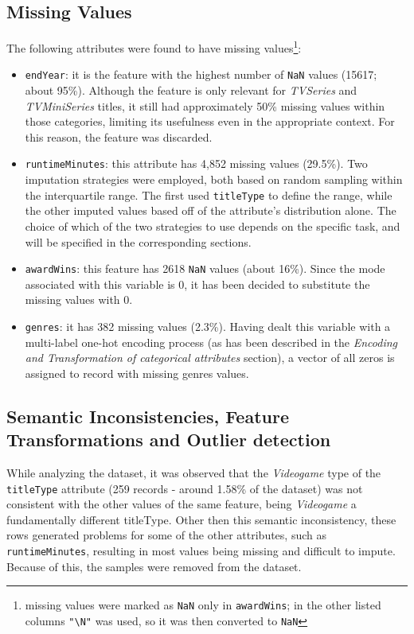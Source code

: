 \subsection{Missing Values}\label{sec:missing_values}
The following attributes were found to have missing values\footnote{missing values were marked as \texttt{NaN}
only in \texttt{awardWins}; in the other listed columns \texttt{"\textbackslash N"} was used, so it was then converted to \texttt{NaN}}:
\begin{itemize}
    \item \texttt{endYear}: it is the feature with the highest number of \texttt{NaN} values (15617; about 95\%).
    Although the feature is only relevant for \textit{TVSeries} and \textit{TVMiniSeries} titles, it still
    had approximately 50\% missing values within those categories, limiting its usefulness even in the
    appropriate context. For this reason, the feature was discarded.
    \vspace{1em}
    
    \item \texttt{runtimeMinutes}: this attribute has 4,852 missing values (29.5\%). Two imputation strategies were employed, both based on random sampling within the interquartile range. 
    The first used \texttt{titleType} to define the range, while the other imputed values based off of the attribute's distribution alone. 
    The choice of which of the two strategies to use depends on the specific task, and will be specified in the corresponding sections.
    
    \item \texttt{awardWins}: this feature has 2618 \texttt{NaN} values (about 16\%).
    Since the mode associated with this variable is 0, it has been decided to substitute the missing
    values with 0.

    \item \texttt{genres}: it has 382 missing values (2.3\%). Having dealt this variable with a
    multi-label one-hot encoding process (as has been described in the \textit{Encoding and Transformation of categorical attributes}
    section), a vector of all zeros is assigned to record with missing genres values.
\end{itemize}



\subsection{Semantic Inconsistencies, Feature Transformations and Outlier detection}
While analyzing the dataset, it was observed that the \textit{Videogame} type of the \texttt{titleType} attribute (259 records - around 1.58\% of the dataset) 
was not consistent with the other values of the same feature, being \textit{Videogame} a fundamentally different titleType.
Other then this semantic inconsistency, these rows generated problems for some of the other attributes, such as \texttt{runtimeMinutes}, resulting in most values being missing and difficult to impute. 
Because of this, the samples were removed from the dataset. \\


